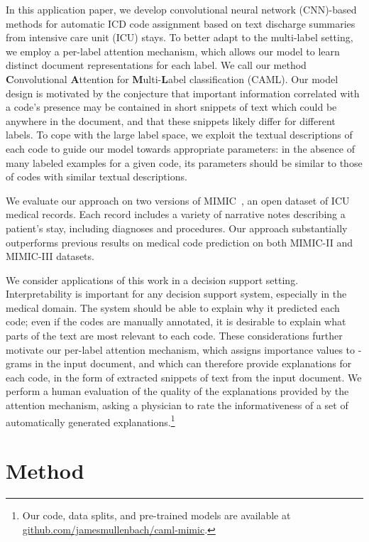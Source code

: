 \documentclass[11pt,a4paper]{article}
\begin{document}
In this application paper, we develop convolutional neural network (CNN)-based methods for automatic ICD code assignment based on text discharge summaries from intensive care unit (ICU) stays. To better adapt to the multi-label setting, we employ a per-label attention mechanism, which allows our model to learn distinct document representations for each label. We call our method \textbf{C}onvolutional \textbf{A}ttention for \textbf{M}ulti-\textbf{L}abel classification (CAML). Our model design is motivated by the conjecture that important information correlated with a code's presence may be contained in short snippets of text which could be anywhere in the document, and that these snippets likely differ for different labels. To cope with the large label space, we exploit the textual descriptions of each code to guide our model towards appropriate parameters: in the absence of many labeled examples for a given code, its parameters should be similar to those of codes with similar textual descriptions. 

We evaluate our approach on two versions of MIMIC~\cite{johnson2016mimic}, an open dataset of ICU medical records. Each record includes a variety of narrative notes describing a patient's stay, including diagnoses and procedures.
Our approach substantially outperforms previous results on medical code prediction on both MIMIC-II and MIMIC-III datasets. 

We consider applications of this work in a decision support setting. Interpretability is important for any decision support system, especially in the medical domain. The system should be able to explain why it predicted each code; even if the codes are manually annotated, it is desirable to explain what parts of the text are most relevant to each code. These considerations further motivate our per-label attention mechanism, which assigns importance values to -grams in the input document, and which can therefore provide explanations for each code, in the form of extracted snippets of text from the input document. We perform a human evaluation of the quality of the explanations provided by the attention mechanism, asking a physician to rate the informativeness of a set of automatically generated explanations.\footnote{Our code, data splits, and pre-trained models are available at \url{github.com/jamesmullenbach/caml-mimic}.}
 \section{Method}
\end{document}
